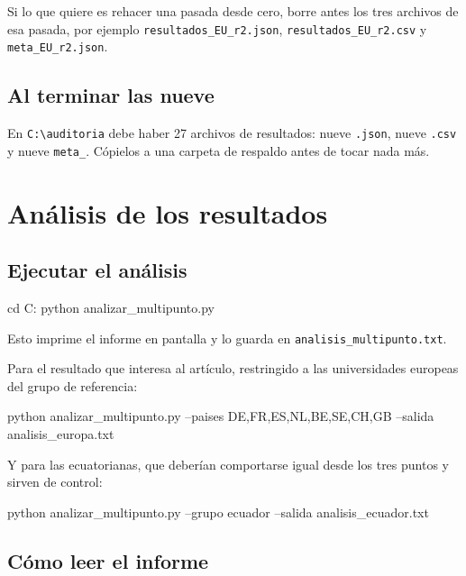 \documentclass[11pt,a4paper]{article}
\begin{document}
Si lo que quiere es rehacer una pasada desde cero, borre antes los tres archivos de esa pasada, por ejemplo \texttt{resultados\_EU\_r2.json}, \texttt{resultados\_EU\_r2.csv} y \texttt{meta\_EU\_r2.json}.

\subsection{Al terminar las nueve}

En \texttt{C:\textbackslash auditoria} debe haber 27 archivos de resultados: nueve \texttt{.json}, nueve \texttt{.csv} y nueve \texttt{meta\_}. Cópielos a una carpeta de respaldo antes de tocar nada más.

\section{Análisis de los resultados}\label{sec:analisis}

\subsection{Ejecutar el análisis}

\begin{orden}
cd C:\auditoria
python analizar_multipunto.py
\end{orden}

Esto imprime el informe en pantalla y lo guarda en \texttt{analisis\_multipunto.txt}.

Para el resultado que interesa al artículo, restringido a las universidades europeas del grupo de referencia:

\begin{orden}
python analizar_multipunto.py --paises DE,FR,ES,NL,BE,SE,CH,GB --salida analisis_europa.txt
\end{orden}

Y para las ecuatorianas, que deberían comportarse igual desde los tres puntos y sirven de control:

\begin{orden}
python analizar_multipunto.py --grupo ecuador --salida analisis_ecuador.txt
\end{orden}

\subsection{Cómo leer el informe}
\end{document}
